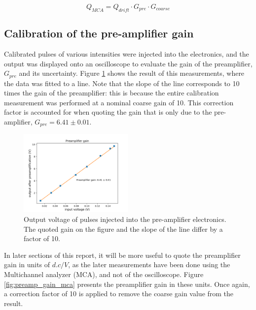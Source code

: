 \begin{equation}
  \label{eq:gain_system}
  Q_{MCA} = Q_{drift}\cdot G_{pre}\cdot G_{coarse}
\end{equation}


\subsection{Calibration of the pre-amplifier gain}
 Calibrated pulses of various intensities were injected into the electronics, and the output was displayed onto an oscilloscope to evaluate the gain of the preamplifier, $G_{pre}$ and its uncertainty. Figure \ref{fig:preamp_gain} shows the result of this measurements, where the data was fitted to a line. Note that the slope of the line corresponds to 10 times the gain of the preamplifier: this is because the entire calibration measurement was performed at a nominal coarse gain of 10. This correction factor is accounted for when quoting the gain that is only due to the pre-amplifier, $G_{pre} = 6.41 \pm 0.01$.

\begin{figure}[H]
  \includegraphics[scale=0.5,width=0.5\textwidth]{graphics/preamp_gain_calibration.png}
  \caption{Output voltage of pulses injected into the pre-amplifier electronics. The quoted gain on the figure and the slope of the line differ by a factor of 10.}
  \label{fig:preamp_gain}
\end{figure}

In later sections of this report, it will be more useful to quote the preamplifier gain in units of $d.c/V$, as the later measurements have been done using the Multichannel analyzer (MCA), and not of the oscilloscope. Figure \ref{fig:preamp_gain_mca} presents the preamplifier gain in these units. Once again, a correction factor of 10 is applied to remove the coarse gain value from the result.


